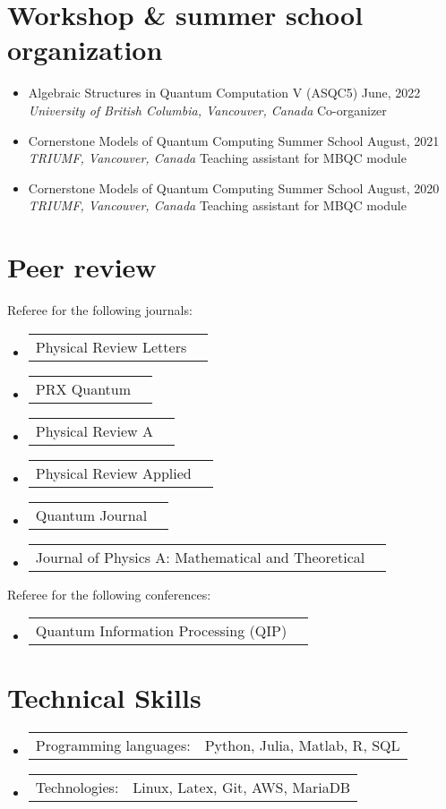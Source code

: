 \documentclass[letterpaper,11pt]{article}
\makeatletter
\newcommand{\OrganizerItem}[4]{
	\item{\parbox{0.97\textwidth}{
			{#1} \hfill {#2}\\
			\emph{#3} \hfill {#4}
		}}
}
\newcommand{\AwardsItem}[2]{
	\item{\vspace{-1pt}
		\begin{tabular*}{0.97\textwidth}{l@{\extracolsep{\fill}}r}
			{#1} & {#2}
		\end{tabular*}
		\vspace{-5pt}
	}
}
\newcommand{\SkillsItem}[2]{
	\item{\vspace{-1pt}
		\begin{tabular*}{0.97\textwidth}{l l}
			{#1:} & {#2}
		\end{tabular*}
		\vspace{-5pt}
	}
}
\makeatother
\begin{document}
\section*{Workshop \& summer school organization}
\begin{itemize}[leftmargin=*]
	\OrganizerItem{Algebraic Structures in Quantum Computation V (ASQC5)}{June, 2022}{University of British Columbia, Vancouver, Canada}{Co-organizer}
	\OrganizerItem{Cornerstone Models of Quantum Computing Summer School}{August, 2021}{TRIUMF, Vancouver, Canada}{Teaching assistant for MBQC module}
	\OrganizerItem{Cornerstone Models of Quantum Computing Summer School}{August, 2020}{TRIUMF, Vancouver, Canada}{Teaching assistant for MBQC module}
\end{itemize}

\section*{Peer review}
Referee for the following journals:\vspace{-2mm}
\begin{itemize}[leftmargin=*]
	\AwardsItem{Physical Review Letters}{}
	\AwardsItem{PRX Quantum}{}
	\AwardsItem{Physical Review A}{}
	\AwardsItem{Physical Review Applied}{}
	\AwardsItem{Quantum Journal}{}
	\AwardsItem{Journal of Physics A: Mathematical and Theoretical}{}
\end{itemize}
Referee for the following conferences:\vspace{-2mm}
\begin{itemize}[leftmargin=*]
	\AwardsItem{Quantum Information Processing (QIP)}{}
\end{itemize}


\section*{Technical Skills}
\begin{itemize}[leftmargin=*]
	\SkillsItem{Programming languages}{Python, Julia, Matlab, R, SQL}
	\SkillsItem{Technologies}{Linux, Latex, Git, AWS, MariaDB}
\end{itemize}

\end{document}
